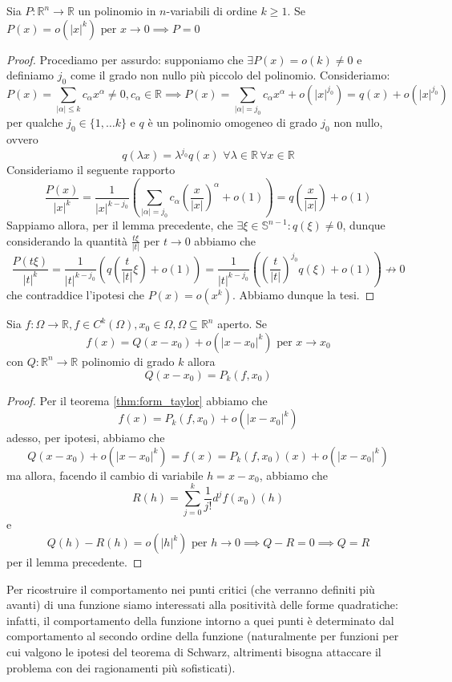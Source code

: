 \documentclass[openany, italian]{book}
\begin{document}
\begin{lemma}
Sia $P:\mathbb{R}^n \to \mathbb{R}$ un polinomio in $n$-variabili di ordine $k \geq 1$. Se $P(x) = o(|x|^k) \text{ per } x \to 0 \implies P = 0$
\end{lemma}
\begin{proof} Procediamo per assurdo: supponiamo che $\exists P(x) = o(k) \neq 0$ e definiamo $j_0$ come il grado non nullo più piccolo del polinomio. Consideriamo:
$$
P(x) = \sum_{|\alpha| \leq k} c_{\alpha}x^{\alpha} \neq 0, c_{\alpha} \in \mathbb{R} \implies P(x) = \sum_{|\alpha| = j_0} c_{\alpha} x^{\alpha} + o(|x|^{j_0}) = q(x) + o(|x|^{j_0})
$$
per qualche $j_0 \in \{1, \ldots k \}$ e $q$ è un polinomio omogeneo di grado $j_0$ non nullo, ovvero 
$$
q(\lambda x) = \lambda^{j_0} q(x) \, \, \forall \lambda \in \mathbb{R} \, \forall x \in \mathbb{R}
$$
Consideriamo il seguente rapporto
$$
\frac{P(x)}{|x|^k} = \frac{1}{|x|^{k-j_0}} \left(\sum_{|\alpha|=j_0} c_{\alpha} \left( \frac{x}{|x|} \right)^{\alpha} + o(1) \right) = q \left( \frac{x}{|x|} \right)+o(1)
$$
Sappiamo allora, per il lemma precedente, che $\exists \xi \in \mathbb{S}^{n-1}: q(\xi) \neq 0$, dunque considerando la quantità $\frac{t\xi}{|t|}$ per $t \to 0$ abbiamo che
$$
\frac{P(t\xi)}{|t|^k} = \frac{1}{|t|^{k-j_0}} \left(q \left( \frac{t}{|t|}\xi \right) + o(1) \right) = \frac{1}{|t|^{k-j_0}} \left( \left( \frac{t}{|t|} \right)^{j_0} q(\xi) + o(1) \right) \not\to 0
$$
che contraddice l'ipotesi che $P(x) = o(x^k)$. Abbiamo dunque la tesi.
\end{proof}
\begin{theorem}
Sia $f: \Omega \to \mathbb{R}, f \in C^k(\Omega), x_0 \in \Omega, \Omega \subseteq \mathbb{R}^n$ aperto. Se
$$
f(x) = Q(x-x_0) + o(|x-x_0|^k) \text{ per } x \to x_0
$$
con $Q: \mathbb{R}^n \to \mathbb{R}$ polinomio di grado $k$ allora
$$
Q(x - x_0) = P_k(f, x_0)
$$
\end{theorem}
\begin{proof}
Per il teorema \ref{thm:form_taylor} abbiamo che
$$
f(x) = P_k(f, x_0) + o(|x-x_0|^k)
$$
adesso, per ipotesi, abbiamo che
$$
Q(x-x_0)+o(|x-x_0|^k) = f(x) = P_k(f, x_0)(x) + o(|x-x_0|^k)
$$
ma allora, facendo il cambio di variabile $h = x-x_0$, abbiamo che
$$
R(h) = \sum_{j=0}^k \frac{1}{j!} d^j f(x_0)(h)
$$
e
$$
Q(h) - R(h) = o(|h|^k) \text{ per } h \to 0 \implies Q - R = 0 \implies Q=R
$$
per il lemma precedente.
\end{proof}
Per ricostruire il comportamento nei punti critici (che verranno definiti più avanti) di una funzione siamo interessati alla positività delle forme quadratiche: infatti, il comportamento della funzione intorno a quei punti è determinato dal comportamento al secondo ordine della funzione (naturalmente per funzioni per cui valgono le ipotesi del teorema di Schwarz, altrimenti bisogna attaccare il problema con dei ragionamenti più sofisticati). \\
\end{document}
